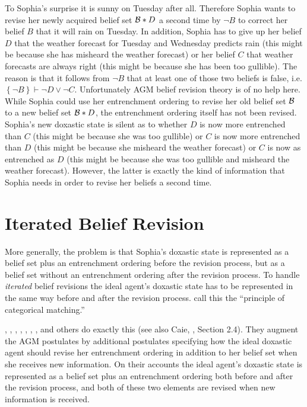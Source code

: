 To Sophia's surprise it is sunny on Tuesday after all. Therefore Sophia wants to revise her newly acquired belief set $\begin{cal}B\end{cal}*D$ a second time by $\neg B$ to correct her belief $B$ that it will rain on Tuesday. In addition, Sophia has to give up her belief $D$ that the weather forecast for Tuesday and Wednesday predicts rain (this might be because she has misheard the weather forecast) or her belief $C$ that weather forecasts are always right (this might be because she has been too gullible). The reason is that it follows from $\neg B$ that at least one of those two beliefs is false, i.e. $\left\{\neg B\right\}\vdash\neg D\vee\neg C$. Unfortunately AGM belief revision theory is of no help here. While Sophia could use her entrenchment ordering to revise her old belief set $\cal B$ to a new belief set $\begin{cal}B\end{cal}*D$, the entrenchment ordering itself has not been revised. Sophia's new doxastic state is silent as to whether $D$ is now more entrenched than $C$ (this might be because she was too gullible) or $C$ is now more entrenched than $D$ (this might be because she misheard the weather forecast) or $C$ is now as entrenched as $D$ (this might be because she was too gullible and misheard the weather forecast). However, the latter is exactly the kind of information that Sophia needs in order to revise her beliefs a second time.


\section{Iterated Belief Revision}

More generally, the problem is that Sophia's doxastic state is represented as a belief set plus an entrenchment ordering before the revision process, but as a belief set without an entrenchment ordering after the revision process. To handle \emph{iterated} belief revisions the ideal agent's doxastic state has to be represented in the same way before and after the revision process. \citet[37]{gr95} call this the ``principle of categorical matching.''

\citet{n94}, \citet{b96}, \citet{dp97}, \citet{s98}, \citet{f00}, \citet{r03}, \citet{r06}, and others do exactly this (see also Caie, , Section 2.4). They augment the AGM postulates by additional postulates specifying how the ideal doxastic agent should revise her entrenchment ordering in addition to her belief set when she receives new information. On their accounts the ideal agent's doxastic state is represented as a belief set plus an entrenchment ordering both before and after the revision process, and both of these two elements are revised when new information is received.


